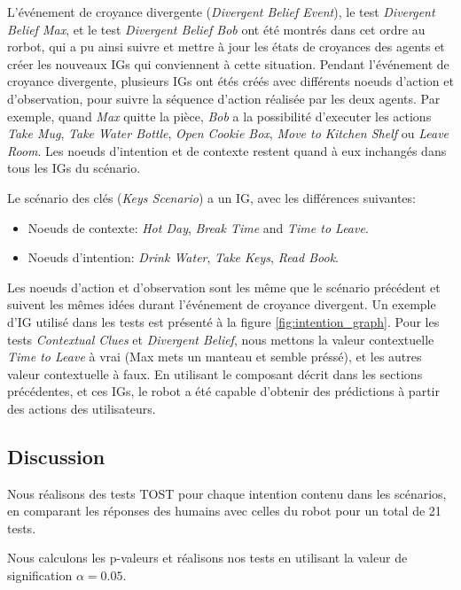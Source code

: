 \documentclass[a4paper,11pt,twoside]{StyleThese}
\begin{document}
L'événement de croyance divergente (\textit{Divergent Belief Event}), le test \textit{Divergent Belief Max}, et le test \textit{Divergent Belief Bob} ont été montrés dans cet ordre au rorbot, qui a pu ainsi suivre et mettre à jour les états de croyances des agents et créer les nouveaux IGs qui conviennent à cette situation. Pendant l'événement de croyance divergente, plusieurs IGs ont étés créés avec différents noeuds d'action et d'observation, pour suivre la séquence d'action réalisée par les deux agents. Par exemple, quand  \textit{Max} quitte la pièce, \textit{Bob} a la possibilité d'executer les actions \textit{Take Mug}, \textit{Take Water Bottle}, \textit{Open Cookie Box}, \textit{Move to Kitchen Shelf} ou \textit{Leave Room}. Les noeuds d'intention et de contexte restent quand à eux inchangés dans tous les IGs du scénario.


Le scénario des clés (\textit{Keys Scenario}) a un IG, avec les différences suivantes:
\begin{itemize}
\item Noeuds de contexte: \textit{Hot Day}, \textit{Break Time} and \textit{Time to Leave}.
\item Noeuds d'intention: \textit{Drink Water}, \textit{Take Keys}, \textit{Read Book}.
\end{itemize}

Les noeuds d'action et d'observation sont les même que le scénario précédent et suivent les mêmes idées durant l'événement de croyance divergent. Un exemple d'IG utilisé dans les tests est présenté à la figure \ref{fig:intention_graph}. Pour les tests \textit{Contextual Clues} et \textit{Divergent Belief}, nous mettons la valeur contextuelle \textit{Time to Leave} à vrai (Max mets un manteau et semble préssé), et les autres valeur contextuelle à faux. En utilisant le composant décrit dans les sections précédentes, et ces IGs, le robot a été capable d'obtenir des prédictions à partir des actions des utilisateurs.

\subsection{Discussion}
\label{discussion}
Nous réalisons des tests TOST pour chaque intention contenu dans les scénarios, en comparant les réponses des humains avec celles du robot pour un total de 21 tests.

Nous calculons les p-valeurs et réalisons nos tests en utilisant la valeur de signification $\alpha=0.05$.
\end{document}

